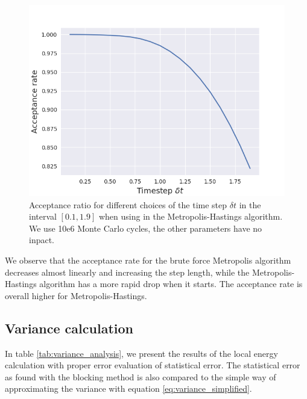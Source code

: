 \documentclass[norsk,a4paper,12pt]{article}
\begin{document}
\begin{figure} [H]
	\centering
	\includegraphics[scale=0.65]{images/acceptance_IS.png}
	\caption{Acceptance ratio for different choices of the time step $\delta t$ in the interval $[0.1,1.9]$ when using in the Metropolis-Hastings algorithm. We use 10e6 Monte Carlo cycles, the other parameters have no inpact.}
	\label{fig:acceptance_IS_timestep}
\end{figure} 
We observe that the acceptance rate for the brute force Metropolis algorithm decreases almost linearly and increasing the step length, while the Metropolis-Hastings algorithm has a more rapid drop when it starts. The acceptance rate is overall higher for Metropolis-Hastings.


\subsection{Variance calculation}

In table \ref{tab:variance_analysis}, we present the results of the local energy calculation with proper error evaluation of statistical error. The statistical error as found with the blocking method is also compared to the simple way of approximating the variance with equation \ref{eq:variance_simplified}. 
\end{document}
